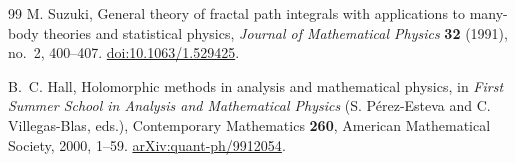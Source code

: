 \documentclass[11pt]{article}
\theoremstyle{definition}
\theoremstyle{remark}
\numberwithin{equation}{section}
\begin{document}
\begin{thebibliography}{99}
M. Suzuki, General theory of fractal path integrals with applications to many-body theories and statistical physics, \emph{Journal of Mathematical Physics} \textbf{32} (1991), no.~2, 400--407.
\href{https://doi.org/10.1063/1.529425}{doi:10.1063/1.529425}.

B.~C. Hall, Holomorphic methods in analysis and mathematical physics, in \emph{First Summer School in Analysis and Mathematical Physics} (S. P\'erez-Esteva and C. Villegas-Blas, eds.), Contemporary Mathematics \textbf{260}, American Mathematical Society, 2000, 1--59.
\href{https://arxiv.org/abs/quant-ph/9912054}{arXiv:quant-ph/9912054}.
\end{thebibliography}
\end{document}

